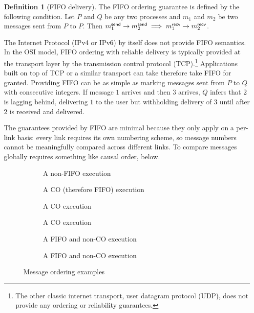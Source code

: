 \documentclass[]             %
{NASA}                       %
\theoremstyle{definition}
\newtheorem{definition}[theorem]{Definition}
\begin{document}
\begin{definition}[FIFO delivery]
  \label{def:fifo}
  The FIFO ordering guarantee is defined by the following condition. Let
  $P$ and $Q$ be any two processes and $m_1$ and $m_2$ be two
  messages sent from $P$ to $P$. Then
  $m_{1}^{\mathsf{send}} \to m_{2}^{\mathsf{send}} \implies m_{1}^{\mathsf{recv}} \to m_{2}^{\mathsf{recv}}$.
\end{definition}

The Internet Protocol (IPv4 or IPv6) by itself does not provide FIFO
semantics. In the OSI model, FIFO ordering with reliable delivery is
typically provided at the transport layer by the transmission control
protocol (TCP).\footnote{The other classic internet transport, user
  datagram protocol (UDP), does not provide any ordering or
  reliability guarantees.} Applications built on top of TCP or a
similar transport can take therefore take FIFO for granted. Providing
FIFO can be as simple as marking messages sent from $P$ to $Q$ with
consecutive integers. If message $1$ arrives and then $3$ arrives, $Q$
infers that $2$ is lagging behind, delivering $1$ to the user but
withholding delivery of $3$ until after $2$ is received and delivered.

The guarantees provided by FIFO are minimal because they only apply on
a per-link basis: every link requires its own numbering scheme, so
message numbers cannot be meaningfully compared across different
links. To compare messages globally requires something like causal
order, below.

\begin{figure}[p]
  \setlength\abovecaptionskip{0ex}
  \setlength\belowcaptionskip{4ex}
  \begin{subfigure}[t]{0.475\textwidth}
    \centering
    
    \caption{A non-FIFO execution}
    \label{fig:ordex-non-fifo}
  \end{subfigure}
  \begin{subfigure}[t]{0.475\textwidth}
  \centering
  
  \caption{A CO (therefore FIFO) execution}
  \label{fig:ordex-co-1}
\end{subfigure}
\begin{subfigure}[b]{0.475\textwidth}
  \centering
  
  \caption{A CO execution}
  \label{fig:ordex-co-2}
\end{subfigure}
\begin{subfigure}[b]{0.475\textwidth}
  \centering
  
  \caption{A CO execution}
  \label{fig:ordex-co-3}
\end{subfigure}
\begin{subfigure}[b]{0.475\textwidth}
  \centering
  
  \caption{A FIFO and non-CO execution}
  \label{fig:ordex-non-co-1}
\end{subfigure}\hfill
\begin{subfigure}[b]{0.475\textwidth}
  \centering
  
  \caption{A FIFO and non-CO execution}
  \label{fig:ordex-non-co-2}
\end{subfigure}
\caption{Message ordering examples}
\label{fig:message-ordering}
\end{figure}
\end{document}
